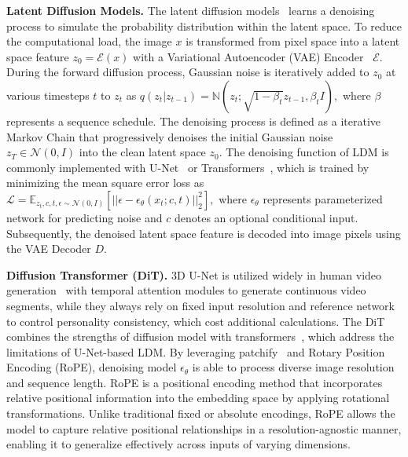 \noindent\textbf{Latent Diffusion Models.} The latent diffusion models~\cite{rombach2022high} learns a denoising process to simulate the probability distribution within the latent space. To reduce the computational load, the image $x$ is transformed from pixel space into a latent space feature $z_0=\mathcal{E}(x)$ with a Variational Autoencoder (VAE) Encoder~\cite{kingma2013auto} $\mathcal{E}$. During the forward diffusion process, Gaussian noise is iteratively added to $z_0$ at various timesteps $t$ to $z_t$ as
$
    q(z_t | z_{t-1}) = \mathbb{N}(z_t;\sqrt{1-\beta_t}z_{t-1}, \beta_tI),
$
where $\beta$ represents a sequence schedule. The denoising process is defined as a iterative Markov Chain that progressively denoises the initial Gaussian noise $z_T \in \mathcal{N}(0, I)$ into the clean latent space $z_0$. The denoising function of LDM is commonly implemented with U-Net~\cite{ronneberger2015u} or Transformers~\cite{vaswani2017attention,peebles2023scalable}, which is trained by minimizing the mean square error loss as
$
    \mathcal{L} = \mathbb{E}_{z_t,c,t,\epsilon \sim \mathcal{N}(0,I)}[||\epsilon - \epsilon_\theta(x_t;c,t)||^2_2],
$ where $\epsilon_\theta$ represents parameterized network for predicting noise and $c$ denotes an optional conditional input. Subsequently, the denoised latent space feature is decoded into image pixels using the VAE Decoder $D$.

\noindent\textbf{Diffusion Transformer (DiT).} 3D U-Net is utilized widely in human video generation~\cite{hu2024animate,zhu2024champ,lin2024cyberhost,xue2024follow} with temporal attention modules to generate continuous video segments, while they always rely on fixed input resolution and reference network to control personality consistency, which cost additional calculations. The DiT~\cite{peebles2023scalable} combines the strengths of diffusion model with transformers~\cite{vaswani2017attention}, which address the limitations of U-Net-based LDM. By leveraging patchify~\cite{peebles2023scalable,yang2024cogvideox} and Rotary Position Encoding (RoPE), denoising model $\epsilon_\theta$ is able to process diverse image resolution and sequence length. 
RoPE is a positional encoding method that incorporates relative positional information into the embedding space by applying rotational transformations. Unlike traditional fixed or absolute encodings, RoPE allows the model to capture relative positional relationships in a resolution-agnostic manner, enabling it to generalize effectively across inputs of varying dimensions.

